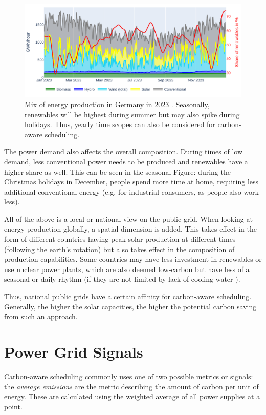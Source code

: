 \begin{figure}
    \includegraphics[width=\linewidth]{agorameter/energy_production_year.pdf}
    \caption[short]{Mix of energy production in Germany in 2023 . Seasonally, renewables will be highest during summer but may also spike during holidays. Thus, yearly time scopes can also be considered for carbon-aware scheduling.}
    \label{fig:energy_mix_year}
\end{figure}

The power demand also affects the overall composition. 
During times of low demand, less conventional power needs to be produced and renewables have a higher share as well.
This can be seen in the seasonal Figure: during the Christmas holidays in December, people spend more time at home, requiring less additional conventional energy (e.g. for industrial consumers, as people also work less).

All of the above is a local or national view on the public grid. 
When looking at energy production globally, a spatial dimension is added. 
This takes effect in the form of different countries having peak solar production at different times (following the earth's rotation) but also takes effect in the composition of production capabilities.
Some countries may have less investment in renewables or use nuclear power plants, which are also deemed low-carbon but have less of a seasonal or daily rhythm (if they are not limited by lack of cooling water ).

Thus, national public grids have a certain affinity for carbon-aware scheduling\cite{wiesner_lets_2021}. Generally, the higher the solar capacities, the higher the potential carbon saving from such an approach. 

\section{Power Grid Signals}
Carbon-aware scheduling commonly uses one of two possible metrics or signals: the \emph{average emissions} are the metric describing the amount of carbon per unit of energy. These are calculated using the weighted average of all power supplies at a point.

